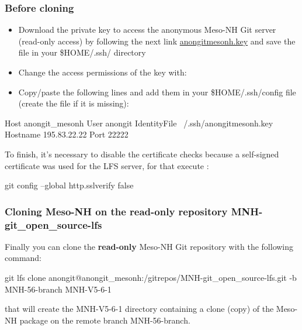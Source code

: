 \subsubsection{Before cloning}

\begin{itemize}
\item Download the private key to access the anonymous Meso-NH Git server (read-only access) by following the next link \href{http://mesonh.aero.obs-mip.fr/mesonh56/GitSources?action=AttachFile&do=get&target=anongitmesonh.key}{anongitmesonh.key} and save the file in your \$HOME/.ssh/ directory
\item Change the access permissions of the key with:
\end{itemize}
\begin{itemize}
\item Copy/paste the following lines and add them in your \$HOME/.ssh/config file (create the file if it is missing):
\end{itemize}
\begin{bashcode}
Host anongit_mesonh
  User anongit
  IdentityFile ~/.ssh/anongitmesonh.key
  Hostname 195.83.22.22
  Port 22222
\end{bashcode}

To finish, it's necessary to disable the certificate checks because a self-signed certificate was used for the LFS server, for that execute :
\begin{bashcode}
git config --global http.sslverify false
\end{bashcode}

\subsubsection{Cloning Meso-NH on the read-only repository MNH-git\_open\_source-lfs}

Finally you can clone the \textbf{read-only} Meso-NH Git repository with the following command:
\begin{bashcode}
git lfs clone anongit@anongit_mesonh:/gitrepos/MNH-git_open_source-lfs.git -b MNH-56-branch MNH-V5-6-1
\end{bashcode}

that will create the MNH-V5-6-1 directory containing a clone (copy) of the Meso-NH package on the remote branch MNH-56-branch.

